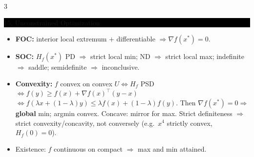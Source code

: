 \documentclass[8pt,letterpaper]{article}
\makeatletter
\newcommand{\sect}[1]{%
  \vspace{2.2pt}%
  \noindent\colorbox{black}{\parbox{\dimexpr\linewidth-2\fboxsep}{%
    \color{white}\bfseries\scshape\fontsize{6.4}{7.4}\selectfont
    \hyphenpenalty=10000\exhyphenpenalty=10000\raggedright #1}}%
  \vspace{1.4pt}\par\nopagebreak\@afterheading}
\newenvironment{tl}
  {\begin{itemize}[leftmargin=6pt,itemsep=0.3pt,topsep=1pt,parsep=0pt,
                   partopsep=0pt,label=\textcolor{gray}{\tiny$\bullet$}]}
  {\end{itemize}}
\newcommand{\tp}{^{\!\top}}
\makeatother
\begin{document}
\begin{multicols}{3}
\sect{15. Unconstrained Optimization}
\begin{tl}
\item \textbf{FOC:} interior local extremum $+$ differentiable $\Rightarrow\nabla f(x^*)=0$.
\item \textbf{SOC:} $H_f(x^*)$ PD $\Rightarrow$ strict local min; ND $\Rightarrow$ strict local max; indefinite $\Rightarrow$ saddle; semidefinite $\Rightarrow$ inconclusive.
\item \textbf{Convexity:} $f$ convex on convex $U\iff H_f$ PSD $\iff f(y)\ge f(x)+\nabla f(x)\tp(y-x)$ $\iff f(\lambda x+(1-\lambda)y)\le\lambda f(x)+(1-\lambda)f(y)$. Then $\nabla f(x^*)=0\Rightarrow$ \textbf{global} min; argmin convex. Concave: mirror for max. \colorbox{black!12}{Strict definiteness $\Rightarrow$ strict convexity/concavity, not conversely} (e.g.\ $x^4$ strictly convex, $H_f(0)=0$).
\item Existence: $f$ continuous on compact $\Rightarrow$ max and min attained.
\end{tl}


\end{multicols}
\end{document}
